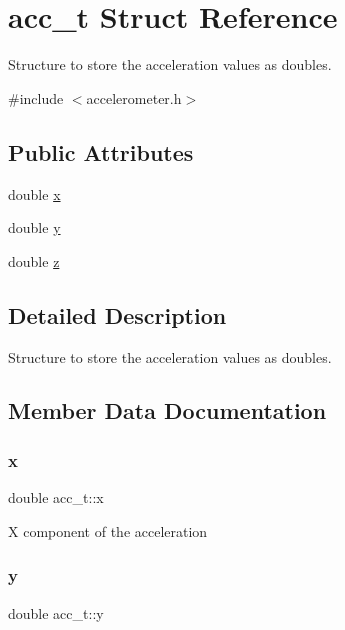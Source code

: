 \hypertarget{structacc__t}{}\section{acc\+\_\+t Struct Reference}
\label{structacc__t}


Structure to store the acceleration values as doubles.  




{\ttfamily \#include $<$accelerometer.\+h$>$}

\subsection*{Public Attributes}
\begin{DoxyCompactItemize}
\item 
double \hyperlink{structacc__t_a5eff36cde9b5bbd97bc9ecdd6e2a302f}{x}
\item 
double \hyperlink{structacc__t_a0cb48808a66ac39db333f77d0e9d0bfe}{y}
\item 
double \hyperlink{structacc__t_af3dcc0d57b5d2027c802f66c4fe28734}{z}
\end{DoxyCompactItemize}


\subsection{Detailed Description}
Structure to store the acceleration values as doubles. 

\subsection{Member Data Documentation}
\mbox{\label{structacc__t_a5eff36cde9b5bbd97bc9ecdd6e2a302f}} 
\subsubsection{\texorpdfstring{x}{x}}
{\footnotesize\ttfamily double acc\+\_\+t\+::x}

X component of the acceleration \mbox{\label{structacc__t_a0cb48808a66ac39db333f77d0e9d0bfe}} 
\subsubsection{\texorpdfstring{y}{y}}
{\footnotesize\ttfamily double acc\+\_\+t\+::y}

